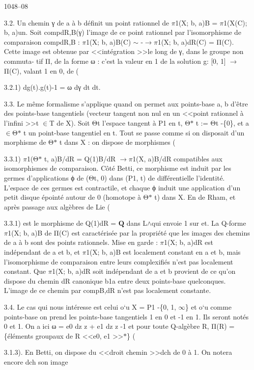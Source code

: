 \documentclass[11pt]{article}
\begin{document}
1048--08 

3.2. Un chemin γ de a à b définit un point rationnel de \(\pi\)1(X; b, a)B = \(\pi\)1(X(C); b, a)un. Soit compdR,B(γ) l’image de ce point rationnel par l’isomorphisme de comparaison compdR,B : \(\pi\)1(X; b, a)B(C) \(\sim\) -\(\to\)\(\pi\)1(X; b, a)dR(C) = Π(C). Cette image est obtenue par <<intégration >>le long de γ, dans le groupe non commuta- tif Π, de la forme ω : c’est la valeur en 1 de la solution g: [0, 1] \(\to\)Π(C), valant 1 en 0, de (

3.2.1) dg(t).g(t)-1 = ω dγ dt  dt. 

3.3. Le même formalisme s’applique quand on permet aux points-base a, b d’être des points-base tangentiels (vecteur tangent non nul en un <<point rationnel à l’infini >>t \(\in\)T de X). Soit Θt l’espace tangent à P1 en t, Θ\(*\) t := Θt -\{0\}, et a \(\in\)Θ\(*\) t un point-base tangentiel en t. Tout se passe comme si on disposait d’un morphisme de Θ\(*\) t dans X : on dispose de morphismes (

3.3.1) \(\pi\)1(Θ\(*\) t, a)B/dR = Q(1)B/dR \(\to\)\(\pi\)1(X, a)B/dR compatibles aux isomorphismes de comparaison. Côté Betti, ce morphisme est induit par les germes d’applications ϕ de (Θt, 0) dans (P1, t) de différentielle l’identité. L’espace de ces germes est contractile, et chaque ϕ induit une application d’un petit disque épointé autour de 0 (homotope à Θ\(*\) t) dans X. En de Rham, et après passage aux algèbres de Lie (

3.3.1) est le morphisme de Q(1)dR = \(\mathbf Q\) dans L\(\wedge\)qui envoie 1 sur et. La Q-forme \(\pi\)1(X; b, a)B de Π(C) est caractérisée par la propriété que les images des chemins de a à b sont des points rationnels. Mise en garde : \(\pi\)1(X; b, a)dR est indépendant de a et b, et \(\pi\)1(X; b, a)B est localement constant en a et b, mais l’isomorphisme de comparaison entre leurs complexifiés n’est pas localement constant. Que \(\pi\)1(X; b, a)dR soit indépendant de a et b provient de ce qu’on dispose du chemin dR canonique b1a entre deux points-base quelconques. L’image de ce chemin par compB,dR n’est pas localement constante. 

3.4. Le cas qui nous intéresse est celui o`u X = P1 -\{0, 1, \(\infty\)\} et o`u comme points-base on prend les points-base tangentiels 1 en 0 et -1 en 1. Ils seront notés 0 et 1. On a ici ω = e0 dz z + e1 dz z -1 et pour toute Q-algèbre R, Π(R) = \{éléments groupaux de R <<e0, e1 >>\(*\)\} (

3.1.3). En Betti, on dispose du <<droit chemin >>dch de 0 à 1. On notera encore dch son image
\end{document}

